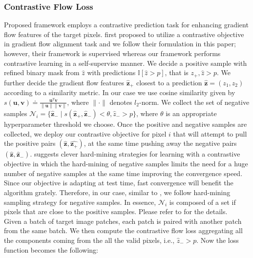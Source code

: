 \subsubsection{Contrastive Flow Loss} \label{sec:tta-cfl}
Proposed framework employs a contrastive prediction task for enhancing gradient flow features of the target pixels. \cite{keaton2023celltranspose} first proposed to utilize a contrastive objective in gradient flow alignment task and we follow their formulation in this paper; however, their framework is supervised whereas our framework performs contrastive learning in a self-supervise manner. We decide a positive sample with refined binary mask from  $\hat{z}$ with predictions $\mathbb{I}[\hat{z}>p]$, that is $\hat{z_+},\hat{z}>p$. We further decide the gradient flow features $\hat{\bm{z}}_+$ closest to a prediction  $\hat{\bm{z}} = (z_1,z_2)$ according to a similarity metric. In our case we use cosine similarity given by $s(\bm{u},\bm{v})\doteq\frac{\bm{u}^T\bm{v}}{\| \bm{u} \| \| \bm{v}\| }$, where $\| \cdot \|$ denotes $l_2$-norm.  We collect the set of negative samples $\mathcal{N}_i = \{ \hat{\bm{ z}}_- \; | \; s(\hat{\bm{ z}}_+,\hat{\bm{ z}}_-) < \theta, \hat{z}_- > p\}$, where $\theta$ is an appropriate hyperparameter threshold we choose. Once the positive and negative samples are collected, we deploy our contrastive objective for pixel $i$ that will attempt to pull the positive pairs $(\hat{\bm{z}}, \hat{\bm{z}_+})$, at the same time pushing away the negative pairs $(\hat{\bm{z}}, \hat{\bm{z}}_-)$.  \cite{wang2021understanding} suggests clever hard-mining strategies for learning with a contrastive objective in which the hard-mining of negative samples limits the need for a huge number of negative samples at the same time improving the convergence speed. Since our objective is adapting at test time, fast convergence will benefit the algorithm grately. Therefore, in our case, similar to \cite{keaton2023celltranspose}, we follow hard-mining sampling strategy for negative samples. In essence, $\mathcal{N}_i$ is composed of a set if pixels that are close to the positive samples. Please refer to  \cite{keaton2023celltranspose} for the details. \\

Given a batch of target image patches, each patch is paired with another patch from the same batch. We then compute the contrastive flow loss aggregating all the components coming from the all the valid pixels, i.e.,  $\hat{z}_- > p$. 
Now the loss function becomes the following:

